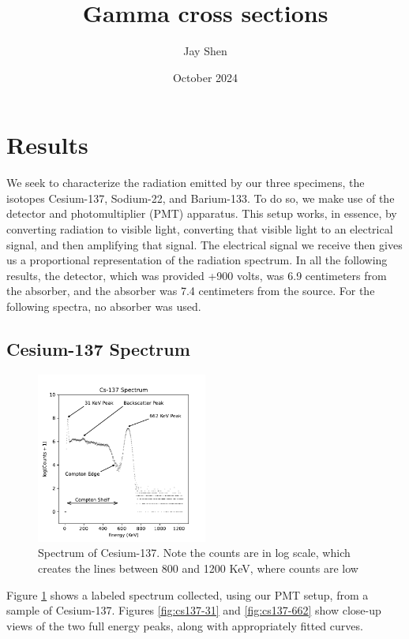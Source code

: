 \documentclass[12pt, letterpaper]{article}
\title{Gamma cross sections}
\author{Jay Shen}
\date{October 2024}
\begin{document}
\maketitle

\section{Results}

We seek to characterize the radiation emitted by our three specimens, the isotopes Cesium-137, Sodium-22, and Barium-133. To do so, we make use of the detector and photomultiplier (PMT) apparatus. This setup works, in essence, by converting radiation to visible light, converting that visible light to an electrical signal, and then amplifying that signal. The electrical signal we receive then gives us a proportional representation of the radiation spectrum. In all the following results, the detector, which was provided +900 volts, was 6.9 centimeters from the absorber, and the absorber was 7.4 centimeters from the source. For the following spectra, no absorber was used. 

\subsection{Cesium-137 Spectrum}

\begin{figure}[h]
    \centering
    \includegraphics[width=0.5\textwidth]{experiment1/figures/cs137/spectrum.pdf}
    \caption{Spectrum of Cesium-137. Note the counts are in log scale, which creates the lines between 800 and 1200 KeV, where counts are low}
    \label{fig:cs137-spectrum}
\end{figure}

Figure \ref{fig:cs137-spectrum} shows a labeled spectrum collected, using our PMT setup, from a sample of Cesium-137. Figures \ref{fig:cs137-31} and \ref{fig:cs137-662} show close-up views of the two full energy peaks, along with appropriately fitted curves. 
\end{document}
